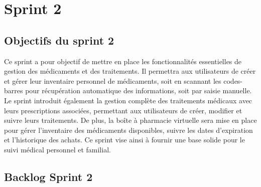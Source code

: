 \section{Sprint 2} 
\subsection{Objectifs du sprint 2}
Ce sprint a pour objectif de mettre en place les fonctionnalités essentielles de gestion des médicaments et des traitements. Il permettra aux utilisateurs de créer et gérer leur inventaire personnel de médicaments, soit en scannant les codes-barres pour récupération automatique des informations, soit par saisie manuelle. Le sprint introduit également la gestion complète des traitements médicaux avec leurs prescriptions associées, permettant aux utilisateurs de créer, modifier et suivre leurs traitements. De plus, la boîte à pharmacie virtuelle sera mise en place pour gérer l'inventaire des médicaments disponibles, suivre les dates d'expiration et l'historique des achats. Ce sprint vise ainsi à fournir une base solide pour le suivi médical personnel et familial.
\subsection{Backlog Sprint 2}

